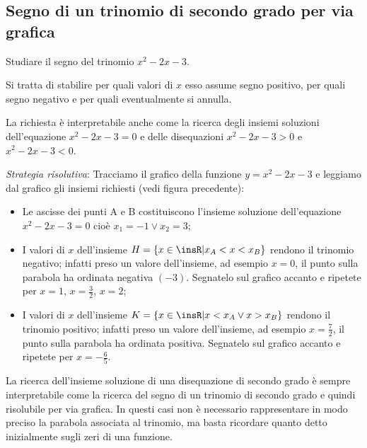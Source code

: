 \subsection{Segno di un trinomio di secondo grado per via grafica}
\begin{exrig}
\begin{esempio}
Studiare il segno del trinomio $x^2-2x-3$.

Si tratta di stabilire per quali valori di $x$ esso assume segno positivo, per quali segno negativo e per quali eventualmente si annulla.

La richiesta è interpretabile anche come la ricerca degli insiemi soluzioni dell’equazione $x^2-2x-3=0$ e delle disequazioni $x^2-2x-3>0$ e $x^2-2x-3<0$.

\emph{Strategia risolutiva}:
Tracciamo il grafico della funzione $y=x^2-2x-3$ e leggiamo dal grafico gli insiemi richiesti (vedi figura precedente):
\begin{itemize}
\item Le ascisse dei punti A e B costituiscono l’insieme soluzione dell’equazione $x^2-2x-3=0$ cioè $x_1=-1\vee x_2=3$;
\item I valori di $x$ dell’insieme $H=\{x\in \insR | x_A<x<x_B\}$ rendono il trinomio negativo; infatti preso un valore dell’insieme, ad esempio $x=0$, il punto sulla parabola ha ordinata negativa $(-3)$. Segnatelo sul grafico accanto e ripetete per $x=1$, $x=\frac 3 2$, $x=2$;
\item I valori di $x$ dell’insieme $K=\{x\in \insR | x<x_A\vee x>x_B\}$ rendono il trinomio positivo; infatti preso un valore dell’insieme, ad esempio $x=\frac 7 2$, il punto sulla parabola ha ordinata positiva. Segnatelo sul grafico accanto e ripetete per $x=-\frac{6}{5}$.
\end{itemize}
\end{esempio}
\end{exrig}
\osservazione La ricerca dell’insieme soluzione di una disequazione di secondo grado è sempre interpretabile come la ricerca del segno di un trinomio di secondo grado e quindi risolubile per via grafica. In questi casi non è necessario rappresentare in modo preciso la parabola associata al trinomio, ma basta ricordare quanto detto inizialmente sugli zeri di una funzione.
